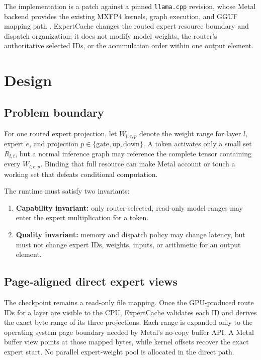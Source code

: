 \documentclass[10pt,twocolumn]{article}
\newcommand{\system}{ExpertCache}
\begin{document}
The implementation is a patch against a pinned \texttt{llama.cpp} revision,
whose Metal backend provides the existing MXFP4 kernels, graph execution, and
GGUF mapping path \cite{llamacpp}.  \system{} changes the routed expert
resource boundary and dispatch organization; it does not modify model weights,
the router's authoritative selected IDs, or the accumulation order within one
output element.

\section{Design}

\subsection{Problem boundary}

For one routed expert projection, let $W_{l,e,p}$ denote the weight range for
layer $l$, expert $e$, and projection $p\in\{\mathrm{gate},\mathrm{up},
\mathrm{down}\}$.  A token activates only a small set $R_{l,t}$, but a normal
inference graph may reference the complete tensor containing every
$W_{l,e,p}$.  Binding that full resource can make Metal account or touch a
working set that defeats conditional computation.

The runtime must satisfy two invariants:

\begin{enumerate}[leftmargin=*]
  \item \textbf{Capability invariant:} only router-selected, read-only model
  ranges may enter the expert multiplication for a token.
  \item \textbf{Quality invariant:} memory and dispatch policy may change
  latency, but must not change expert IDs, weights, inputs, or arithmetic for
  an output element.
\end{enumerate}

\subsection{Page-aligned direct expert views}

The checkpoint remains a read-only file mapping.  Once the GPU-produced route
IDs for a layer are visible to the CPU, \system{} validates each ID and derives
the exact byte range of its three projections.  Each range is expanded only to
the operating system page boundary needed by Metal's no-copy buffer API.  A
Metal buffer view points at those mapped bytes, while kernel offsets recover
the exact expert start.  No parallel expert-weight pool is allocated in the
direct path.
\end{document}
